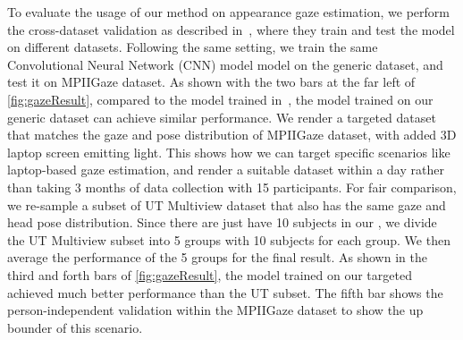 To evaluate the usage of our method on appearance gaze estimation, we perform the cross-dataset validation as described in~\cite{zhang15_cvpr}, where they train and test the model on different datasets. Following the same setting, we train the same Convolutional Neural Network (CNN) model model on the generic \dataset dataset, and test it on MPIIGaze dataset. As shown with the two bars at the far left of \autoref{fig:gazeResult}, compared to the model trained in~\cite{sugano2014learning}, the model trained on our generic \dataset dataset can achieve similar performance. 
We render a targeted \dataset dataset that matches the gaze and pose distribution of MPIIGaze dataset, with added 3D laptop screen emitting light. This shows how we can target specific scenarios like laptop-based gaze estimation, and render a suitable dataset within a day rather than taking 3 months of data collection with 15 participants. For fair comparison, we re-sample a subset of UT Multiview dataset that also has the same gaze and head pose distribution. Since there are just have 10 subjects in our \dataset, we divide the UT Multiview subset into 5 groups with 10 subjects for each group. We then average the performance of the 5 groups for the final result. As shown in the third and forth bars of \autoref{fig:gazeResult}, the model trained on our targeted \dataset achieved much better performance than the UT subset. The fifth bar shows the person-independent validation within the MPIIGaze dataset to show the up bounder of this scenario.




